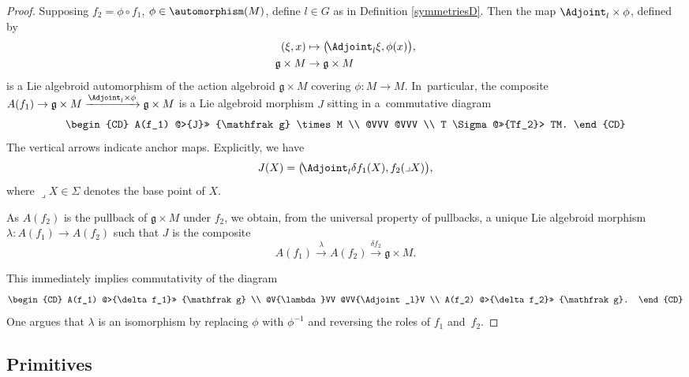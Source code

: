 \begin{proof} Supposing $f_2 = \phi \circ f_1$, $\phi \in
\automorphism(M)$, define $l \in G$ as in Definition
\ref{symmetriesD}. Then the map $\Adjoint_l \times \phi $, defined by
 \begin{align*}
 (\xi,x) &\mapsto \big(\!\Adjoint_l \xi , \phi(x)\big),
 \\
{\mathfrak g} \times M &\rightarrow {\mathfrak g} \times M
 \end{align*}
 is a Lie algebroid automorphism of the action
algebroid ${\mathfrak g} \times M$ covering $\phi \colon M \rightarrow
M$. In~particular, the composite $A(f_1) \rightarrow {\mathfrak g}
\times M \xrightarrow{\Adjoint_l \times \phi} {\mathfrak g} \times M$
is a Lie algebroid morphism $J$ sitting in a~com\-mutative diagram
\begin{equation*}
 \begin{CD}
 A(f_1) @>{J}>> {\mathfrak g} \times M \\ @VVV @VVV \\
T \Sigma @>>{Tf_2}> TM.
 \end{CD}
\end{equation*}
The vertical arrows indicate anchor maps. Explicitly, we have
\[
J(X) = \big(\!\Adjoint_l \delta f_1 (X), f_2(\lrcorner X)\big),
\]
where $\lrcorner X \in \Sigma$ denotes the base point of $X$.

As $A(f_2)$ is the pullback of ${\mathfrak g} \times M$ under $f_2$,
we obtain, from the universal property of pullbacks, a unique Lie
algebroid morphism $\lambda \colon A(f_1) \rightarrow A(f_2)$ such
that $J $ is the composite
 \[
 A(f_1) \xrightarrow{\lambda} A(f_2) \xrightarrow{\delta f_2}
 {\mathfrak g} \times M.
 \]

This immediately implies commutativity of the diagram
\begin{equation*}
 \begin{CD} A(f_1) @>{\delta f_1}>> {\mathfrak g} \\
@V{\lambda}VV @VV{\Adjoint_l}V \\ A(f_2) @>{\delta f_2}>> {\mathfrak g}.
 \end{CD}
\end{equation*}
One argues that $\lambda$ is an isomorphism by
replacing $\phi $ with $\phi^{-1}$ and reversing the roles of $f_1$
and~$f_2$.
\end{proof}

\subsection*{Primitives}

